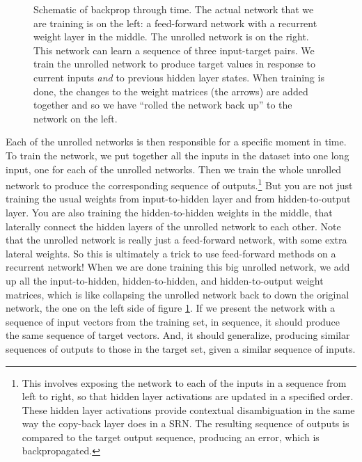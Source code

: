 \begin{figure}[h]
\centering
{}
\caption[Jeff Yoshimi.]{Schematic of backprop through time. The actual network that we are training is on the left: a feed-forward network with a recurrent weight layer in the middle. The unrolled network is on the right. This network can learn a sequence of three input-target pairs. We train the unrolled network to produce target values in response to current inputs \emph{and} to previous hidden layer states. When training is done, the changes to the weight matrices (the arrows) are added together and so we have ``rolled the network back up'' to the network on the left.}
\label{bptt}
\end{figure}


Each of the unrolled networks is then responsible for a specific moment in time. To train the network, we put together all the inputs in the dataset into one long input, one for each of the unrolled networks. Then we train the whole unrolled network to produce the corresponding sequence of outputs.\footnote{This involves exposing the network to each of the inputs in a sequence from left to right, so that hidden layer activations are updated in a specified order. These hidden layer activations provide contextual disambiguation in the same way the copy-back layer does in a SRN. The resulting sequence of outputs is compared to the target output sequence, producing an error, which is backpropagated.} But you are not just training the usual weights from input-to-hidden layer and from hidden-to-output layer. You are also training the hidden-to-hidden weights in the middle, that laterally connect the hidden layers  of the unrolled network to each other. Note that the unrolled network is really just a feed-forward network, with some extra lateral weights. So this is ultimately a trick to use feed-forward methods on a recurrent network! When we are done training this big unrolled network, we add up all the input-to-hidden, hidden-to-hidden, and hidden-to-output weight matrices, which is like collapsing the unrolled network back to down the original network, the one on the left side of figure \ref{bptt}. If we present the network with a sequence of input vectors from the training set, in sequence, it should produce the same sequence of target vectors. And, it should generalize, producing similar sequences of outputs to those in the target set, given a similar sequence of inputs. 

